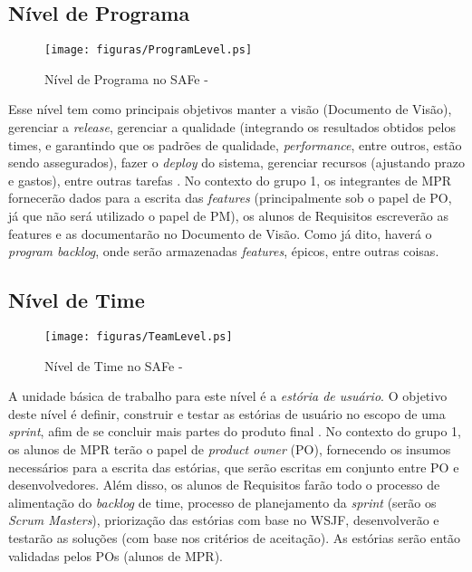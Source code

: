 \subsection{Nível de Programa}
\begin{figure}[h]
  \centering
  \caption{Nível de Programa no SAFe - \cite[p. 39]{safe001}}
  \texttt{[image: figuras/ProgramLevel.ps]}
\end{figure}
Esse nível tem como principais objetivos manter a visão (Documento de Visão), gerenciar a \emph{release}, gerenciar a qualidade (integrando os resultados obtidos pelos times, e garantindo que os padrões de qualidade, \emph{performance}, entre outros, estão sendo assegurados), fazer o \emph{deploy} do sistema, gerenciar recursos (ajustando prazo e gastos), entre outras tarefas \cite[p. 63-64]{safe001}. No contexto do grupo 1, os integrantes de MPR fornecerão dados para a escrita das \emph{features} (principalmente sob o papel de PO, já que não será utilizado o papel de PM), os alunos de Requisitos escreverão as features e as documentarão no Documento de Visão. Como já dito, haverá o \emph{program backlog}, onde serão armazenadas \emph{features}, épicos, entre outras coisas.

\subsection{Nível de Time}
\begin{figure}[h]
  \centering
  \caption{Nível de Time no SAFe - \cite[p. 34]{safe001}}
  \texttt{[image: figuras/TeamLevel.ps]}
\end{figure}
A unidade básica de trabalho para este nível é a \emph{estória de usuário}. O objetivo deste nível é definir, construir e testar as estórias de usuário no escopo de uma \emph{sprint}, afim de se concluir mais partes do produto final \cite[p. 47-48]{safe001}. No contexto do grupo 1, os alunos de MPR terão o papel de \emph{product owner} (PO), fornecendo os insumos necessários para a escrita das estórias, que serão escritas em conjunto entre PO e desenvolvedores. Além disso, os alunos de Requisitos farão todo o processo de alimentação do \emph{backlog} de time, processo de planejamento da \emph{sprint} (serão os \emph{Scrum Masters}), priorização das estórias com base no WSJF, desenvolverão e testarão as soluções (com base nos critérios de aceitação). As estórias serão então validadas pelos POs (alunos de MPR).


